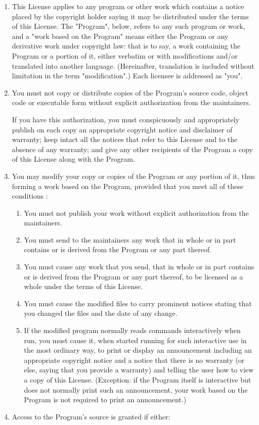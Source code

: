 \begin{enumerate}
  \item
    This License applies to any program or other work which contains a
    notice placed by the copyright holder saying it may be distributed
    under the terms of this License. The "Program", below, refers
    to any such program or work, and a "work based on the Program"
    means either the Program or any derivative work under copyright law:
    that is to say, a work containing the Program or a portion of it,
    either verbatim or with modifications and/or translated into another
    language. (Hereinafter, translation is included without limitation in
    the term "modification".) Each licensee is addressed as "you".
  \item
    You must not copy or distribute copies of the Program's source
    code, object code or executable form without explicit authorization
    from the maintainers.

    If you have this authorization, you must conspicuously and
    appropriately publish on each copy an appropriate copyright notice
    and disclaimer of warranty; keep intact all the notices that refer
    to this License and to the absence of any warranty; and give any
    other recipients of the Program a copy of this License along with
    the Program.
  \item
    You may modify your copy or copies of the Program or any portion of
    it, thus forming a work based on the Program, provided that you
    meet all of these conditions :

    \begin{enumerate}
      \item
	You must not publish your work without explicit authorization
	from the maintainers.
      \item
	You must send to the maintainers any work that in whole or in
	part contains or is derived from the Program or any part thereof.
      \item
	You must cause any work that you send, that in whole or in
	part contains or is derived from the Program or any part thereof,
	to be licensed as a whole under the terms of this License.
      \item
	You must cause the modified files to carry prominent notices
	stating that you changed the files and the date of any change.
      \item
	If the modified program normally reads commands interactively
	when run, you must cause it, when started running for such
	interactive use in the most ordinary way, to print or display an
	announcement including an appropriate copyright notice and a
	notice that there is no warranty (or else, saying that you
	provide a warranty) and telling the user how to view a copy
	of this License. (Exception: if the Program itself is interactive
	but does not normally print such an announcement, your work based
	on the Program is not required to print an announcement.)
    \end{enumerate}
  \item
    Access to the Program's source is granted if either:


\end{enumerate}
